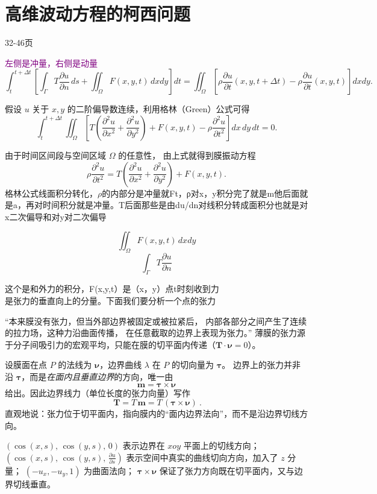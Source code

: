 \section{高维波动方程的柯西问题}
32-46页
\begin{solution}
\textcolor{purple}{左侧是冲量，右侧是动量}
\[
\int_t^{t+\Delta t}
\left[
\int_\Gamma T\frac{\partial u}{\partial n}\,ds
+\iint_\Omega F(x,y,t)\,dxdy
\right] dt
=
\iint_\Omega
\left[
\rho\frac{\partial u}{\partial t}(x,y,t+\Delta t)
-\rho\frac{\partial u}{\partial t}(x,y,t)
\right] dxdy.
\]

\begin{dxsolution}
      
假设 \(u\) 关于 \(x,y\) 的二阶偏导数连续，利用格林（Green）公式可得
\[
\int_t^{t+\Delta t}
\iint_\Omega
\left[
T\left(\frac{\partial^2 u}{\partial x^2}
+\frac{\partial^2 u}{\partial y^2}\right)
+F(x,y,t)
-\rho\frac{\partial^2 u}{\partial t^2}
\right] dx\,dy\,dt=0.
\]

由于时间区间段与空间区域 \(\Omega\) 的任意性，
由上式就得到膜振动方程
\[
\rho\frac{\partial^2 u}{\partial t^2}
=
T\left(\frac{\partial^2 u}{\partial x^2}
+\frac{\partial^2 u}{\partial y^2}\right)
+F(x,y,t).
\]
\tcblower
格林公式线面积分转化，$\rho$的内部分是冲量就Ft，ρ对x，y积分完了就是m他后面就是a，再对时间积分就是冲量。T后面那些是由du/dn对线积分转成面积分也就是对x二次偏导和对y对二次偏导
\end{dxsolution}
\begin{dxsolution}
\[ \iint_\Omega F(x,y,t)\,dxdy
\]
\[\int_\Gamma T\frac{\partial u}{\partial n}\]

\tcblower
这个是和外力的积分，F(x,y,t）是（x，y）点t时刻收到力\\是张力的垂直向上的分量。下面我们要分析一个点的张力
\end{dxsolution}
\begin{dxtips}
“本来膜没有张力，但当外部边界被固定或被拉紧后，
内部各部分之间产生了连续的拉力场，这种力沿曲面传播，
在任意截取的边界上表现为张力。”
薄膜的张力源于分子间吸引力的宏观平均，只能在膜的切平面内传递（$\mathbf{T}\cdot\boldsymbol{\nu}=0$）。

设膜面在点 $P$ 的法线为 $\boldsymbol{\nu}$，边界曲线 $\lambda$ 在 $P$ 的切向量为 $\boldsymbol{\tau}$。
边界上的张力并非沿 $\boldsymbol{\tau}$，而是\emph{在面内且垂直边界}的方向，唯一由
\[
\boxed{\ \boldsymbol{m}=\boldsymbol{\tau}\times\boldsymbol{\nu}\ }
\]
给出。因此边界线力（单位长度的张力向量）写作
\[
\boxed{\ \boldsymbol{T}=T\,\boldsymbol{m}=T\,(\boldsymbol{\tau}\times\boldsymbol{\nu})\ }.
\]
直观地说：张力位于切平面内，指向膜内的“面内边界法向”，而不是沿边界切线方向。
\end{dxtips}
\begin{dxsolution}
{\color{purple}$(\cos(x,s),\,\cos(y,s),\,0)$ 表示边界在 $xoy$ 平面上的切线方向；}
{\color{purple}$(\cos(x,s),\,\cos(y,s),\,\tfrac{\partial u}{\partial s})$ 表示空间中真实的曲线切向方向，加入了 $z$ 分量；}
{\color{purple}$(-u_x,-u_y,1)$ 为曲面法向；}
{\color{purple}$\boldsymbol{\tau}\times\boldsymbol{\nu}$ 保证了张力方向既在切平面内，又与边界切线垂直。}


\end{dxsolution}
\end{solution}
